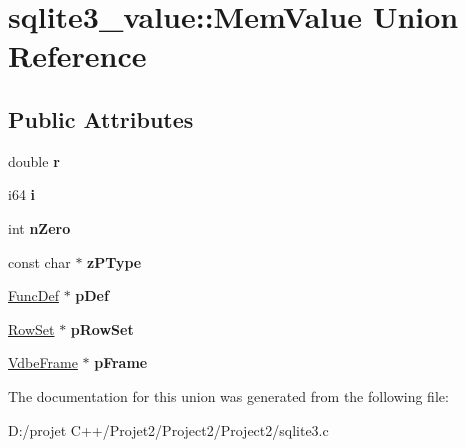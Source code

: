 \hypertarget{unionsqlite3__value_1_1_mem_value}{}\section{sqlite3\+\_\+value\+:\+:Mem\+Value Union Reference}
\label{unionsqlite3__value_1_1_mem_value}
\subsection*{Public Attributes}
\begin{DoxyCompactItemize}
\item 
\mbox{\label{unionsqlite3__value_1_1_mem_value_a1ee2234757006f9ee4e53f559ecf0deb}} 
double {\bfseries r}
\item 
\mbox{\label{unionsqlite3__value_1_1_mem_value_a78ff7d79ce07bfb54646dbbb3eae0dc4}} 
i64 {\bfseries i}
\item 
\mbox{\label{unionsqlite3__value_1_1_mem_value_ab645dbef00d6f58e885d8b1d072ab205}} 
int {\bfseries n\+Zero}
\item 
\mbox{\label{unionsqlite3__value_1_1_mem_value_aed94bbb7318a22f97e8c9d2f8b6031b5}} 
const char $\ast$ {\bfseries z\+P\+Type}
\item 
\mbox{\label{unionsqlite3__value_1_1_mem_value_a971d4e0122cca11b98f7f64cb757302b}} 
\mbox{\hyperlink{struct_func_def}{Func\+Def}} $\ast$ {\bfseries p\+Def}
\item 
\mbox{\label{unionsqlite3__value_1_1_mem_value_a15ef2ed54811f5144c61c2431fae0348}} 
\mbox{\hyperlink{struct_row_set}{Row\+Set}} $\ast$ {\bfseries p\+Row\+Set}
\item 
\mbox{\label{unionsqlite3__value_1_1_mem_value_a9947b4461014f704509a995cb0020729}} 
\mbox{\hyperlink{struct_vdbe_frame}{Vdbe\+Frame}} $\ast$ {\bfseries p\+Frame}
\end{DoxyCompactItemize}


The documentation for this union was generated from the following file\+:\begin{DoxyCompactItemize}
\item 
D\+:/projet C++/\+Projet2/\+Project2/\+Project2/sqlite3.\+c\end{DoxyCompactItemize}
